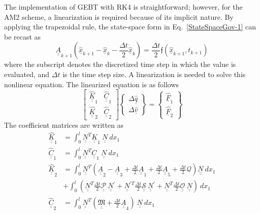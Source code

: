 \documentclass{aiaa-tc}
\newcommand{\tens}[1]{\underline{\underline{#1}}}
\renewcommand{\vec}[1]{\underline{#1}}
\begin{document}
The implementation of GEBT with RK4 is straightforward; however, for the AM2 scheme, a linearization is required because of its implicit nature. By applying the trapezoidal rule, the state-space form in Eq.~\eqref{StateSpaceGov-1} can be recast as
\begin{equation}
    \label{AM2-Govn}
    \tens{A}_{k+1} (\hat{\vec{x}}_{k+1}-\hat{\vec{x}}_{k} - \frac{\Delta t}{2} \vec{\dot{\hat{x}}}_k) =  \frac{\Delta t}{2} \mathfrak{f}(\hat{\vec{x}}_{k+1},t_{k+1})  
\end{equation}
where the subscript denotes the discretized time step in which the value is evaluated, and $\Delta t$ is the time step size. A linearization is needed to solve this nonlinear equation. The linearized equation is as follows
\begin{equation}
    \label{AM2-Linearized}
    \begin{bmatrix}
    \hat{\tens{K}}_1 & \hat{\tens{C}}_1 \\
    \hat{\tens{K}}_2 & \hat{\tens{C}}_2
    \end{bmatrix}
    \begin{Bmatrix}
    \Delta \hat{\vec{q}} \\
    \Delta \hat{\vec{v}}
    \end{Bmatrix}
    =
    \begin{Bmatrix}
    \hat{\vec{F}}_1 \\
    \hat{\vec{F}}_2
    \end{Bmatrix}
\end{equation}
The coefficient matrices are written as
\begin{align}
    \label{Linear-K1}
    \hat{\tens{K}}_1 &= \int_0^l \tens{N}^T\tens{K}_1~\tens{N}~dx_1 \\
    \label{Linear-C1} 
    \hat{\tens{C}}_1 &= \int_0^l \tens{N}^T\tens{C}_1~\tens{N}~dx_1 \\
    \label{Linear-K2}
    \hat{\tens{K}}_2 &= \int_0^l  \tens{N}^T (\tens{A}_2 - \tens{A}_3 + \frac{\Delta t}{2} \tens{A}_1 + \frac{\Delta t}{2} \tens{A}_5 + \frac{\Delta t}{2} \mathcal{Q}) \tens{N}~dx_1 \nonumber \\
    &+ \int_0^l \left( \tens{N}^T \frac{\Delta t}{2} \tens{\mathcal{P}}~ \tens{N}^\prime + \tens{N}^{\prime T} \frac{\Delta t}{2} \tens{\mathcal{S}}~ \tens{N}^\prime + \tens{N}^T \frac{\Delta t}{2} \tens{\mathcal{O}}~ \tens{N}\right) ~dx_1 \\
    \label{Linear-C2}
    \hat{\tens{C}}_2 &= \int_0^l \tens{N}^T (\tens{\mathfrak{M}}+\frac{\Delta t}{2} \tens{A}_4)~\tens{N}~dx_1
\end{align}
\end{document}
